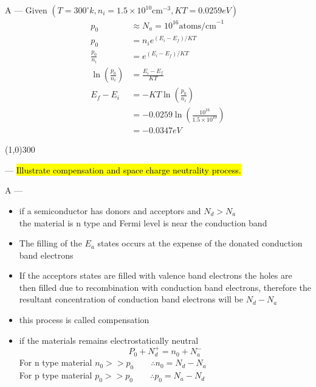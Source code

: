 \documentclass[12pt,a4paper]{article}
\newcounter{question}
\newcommand\Que[1]{
   \line(1,0){300}
   \leavevmode\par
   \stepcounter{question}
   \noindent
   \fbox{\thequestion. Q} --- \hl{#1}\par}
\newcommand\Ans[2][]{%
    \leavevmode\par\noindent
   {\leftskip16pt
    A --- \textbf{#1}#2\par}}
\begin{document}
\begin{large}
\Ans{
Given $(T=300^{\circ} k, n_i = 1.5 \times 10^{10} \text{cm}^{-3}, KT=0.0259 eV)$
\begin{align*}
p_0 &\approx N_a = 10^{16} \text{atoms/cm}^{-1}\\
p_0 &= n_i e^{(E_i - E_f)/KT}\\
\frac{p_0}{n_i}&= e^{(E_i - E_f)/KT}\\
\ln \left( \frac{p_0}{n_i} \right) &= \frac{E_i - E_f}{KT}\\
E_f - E_i &= - KT \ln\left(\frac{p_0}{n_i}\right)\\
&= - 0.0259\ln \left( \frac{10^{16}}{1.5 \times 10^{10}} \right)\\
&= -0.0347 eV
\end{align*}
}

\Que{
Illustrate compensation and space charge neutrality process.
}
\Ans{
\begin{itemize}
\item if a semiconductor has donors and acceptors and $N_d>N_a$\\
the material is n type and Fermi level is near the conduction band 

\item The filling of the $E_a$ states occurs at the expense of the donated conduction band electrons

\item If the acceptors states are filled with valence band electrons the holes are then filled due to recombination with conduction band electrons, therefore the resultant concentration of conduction band electrons will be $N_d - N_a$

\item this process is called compensation

\item if the materials remains electrostatically neutral $$P_0 + N_d^+ = n_0 + N_a^-$$ 
For n type material $n_0 >> p_0 \quad\quad \therefore n_0 = N_d - N_a$\\
For p type material $p_0 >> p_0 \quad\quad \therefore p_0 = N_a - N_d$\\
\end{itemize}
}


\end{large}
\end{document}
